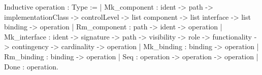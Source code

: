 Inductive operation : Type :=
 | Mk_component : ident -> path -> implementationClass -> 
                  controlLevel -> list component -> list interface -> 
                  list binding -> operation
 | Rm_component : path -> ident -> operation
 | Mk_interface : ident -> signature -> path -> visibility -> 
                  role -> functionality -> contingency -> 
                  cardinality -> operation
 | Mk_binding   : binding -> operation 
 | Rm_binding   : binding -> operation
 | Seq          : operation -> operation -> operation
 | Done         : operation.